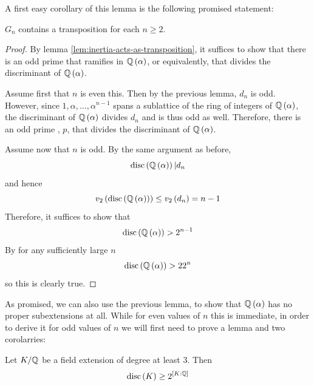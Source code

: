 \documentclass[../main.tex]{subfiles}
\begin{document}
A first easy corollary of this lemma is the following promised statement:
\begin{corollary}
  $G_n$ contains a transposition for each $n \geq 2$.
\end{corollary}
\begin{proof}
  
  By lemma \ref{lem:inertia-acts-as-transposition}, it suffices to show that there is an odd prime that ramifies in $\mathbb{Q}\left( \alpha \right)$, or equivalently, that divides the discriminant of $\mathbb{Q}\left( \alpha \right)$.

  Assume first that $n$ is even this.
  Then by the previous lemma, $d_n$ is odd.
   However, since $1, \alpha, \dots, \alpha^{n-1}$ spans a sublattice of the ring of integers of $\mathbb{Q}\left( \alpha \right)$, the discriminant of $\mathbb{Q}\left( \alpha \right)$ divides $d_n$ and is thus odd as well.
  Therefore, there is an odd prime , $p$, that divides the discriminant of $\mathbb{Q}\left( \alpha \right)$.

  Assume now that $n$ is odd.
  By the same argument as before, 
  \[
    \operatorname{disc}\left( \mathbb{Q}\left( \alpha \right) \right) | d_n
  \]
  and hence 
  \[
    v_2\left( \operatorname{disc}\left( \mathbb{Q}\left( \alpha \right) \right) \right) \leq v_2\left( d_n \right) = n - 1
  \]
  Therefore, it suffices to show that 
  \[
    \operatorname{disc}\left( \mathbb{Q}\left( \alpha \right) \right) > 2^{n - 1}
  \]
  By \cite{OdlyzkoBoundsII} for any sufficiently large $n$ 
  \[
    \operatorname{disc}\left( \mathbb{Q}\left( \alpha \right) \right) > 22^{n}
  \]
  so this is clearly true.
\end{proof}
As promised, we can also use the previous lemma, to show that $\mathbb{Q}\left( \alpha \right)$ has no proper subextensions at all.
While for even values of $n$ this is immediate, in order to derive it for odd values of $n$ we will first need to prove a lemma and two corolarries: 
\begin{lemma}
  Let $K/\mathbb{Q}$ be a field extension of degree at least $3$.
  Then 
  \[
    \operatorname{disc}\left( K \right) \geq 2^{\left[ K : \mathbb{Q} \right]}
  \]
\end{lemma}
\end{document}
